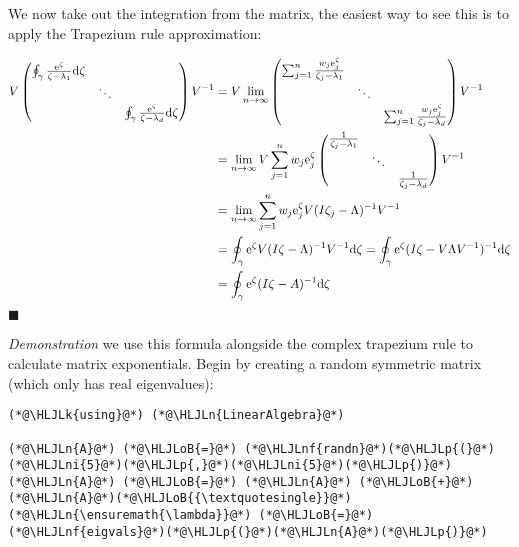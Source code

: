 \documentclass[12pt,a4paper]{article}
\newcommand{\HLJLk}[1]{\textcolor[RGB]{148,91,176}{\textbf{#1}}}
\newcommand{\HLJLn}[1]{#1}
\newcommand{\HLJLnf}[1]{\textcolor[RGB]{66,102,213}{#1}}
\newcommand{\HLJLni}[1]{\textcolor[RGB]{59,151,46}{#1}}
\newcommand{\HLJLoB}[1]{\textcolor[RGB]{102,102,102}{\textbf{#1}}}
\newcommand{\HLJLp}[1]{#1}
\def\D{ {\rm d} }
\def\E{ {\rm e} }
\begin{document}
We now take out the integration from the matrix, the easiest way to see this is to apply the Trapezium rule approximation:


\begin{align*}
V\begin{pmatrix} \oint_\gamma {\E^\zeta \over \zeta - \lambda_1 } \D\zeta \\ & \ddots \\ && \oint_\gamma {\E^\zeta \over \zeta - \lambda_d } \D\zeta\end{pmatrix} V^{-1} &= V\lim_{n \rightarrow \infty} \begin{pmatrix} \sum_{j=1}^n {w_j \E^\zeta_j \over \zeta_j - \lambda_1 }  \\ & \ddots \\ && \sum_{j=1}^n {w_j \E^\zeta_j \over \zeta_j - \lambda_d } \end{pmatrix} V^{-1} \\
&= \lim_{n \rightarrow \infty}  V\sum_{j=1}^n w_j \E^\zeta_j \begin{pmatrix}  {1 \over \zeta_j - \lambda_1 }  \\ & \ddots \\ &&  {1 \over \zeta_j - \lambda_d } \end{pmatrix} V^{-1} \\
&= \lim_{n \rightarrow \infty}  \sum_{j=1}^n w_j \E^\zeta_j V(I \zeta_j - \Lambda)^{-1}V^{-1} \\
&= \oint_\gamma \E^\zeta V(I \zeta - \Lambda)^{-1} V^{-1} \D \zeta 
= \oint_\gamma \E^\zeta (I \zeta - V\Lambda V^{-1})^{-1}  \D \zeta \\
& = \oint_\gamma \E^\zeta (I \zeta - A)^{-1}  \D \zeta \\
\end{align*}
\ensuremath{\blacksquare}

\emph{Demonstration} we use this formula alongside the complex trapezium rule to calculate matrix exponentials.  Begin by creating a random symmetric matrix (which only has real eigenvalues):


\begin{lstlisting}
(*@\HLJLk{using}@*) (*@\HLJLn{LinearAlgebra}@*)

(*@\HLJLn{A}@*) (*@\HLJLoB{=}@*) (*@\HLJLnf{randn}@*)(*@\HLJLp{(}@*)(*@\HLJLni{5}@*)(*@\HLJLp{,}@*)(*@\HLJLni{5}@*)(*@\HLJLp{)}@*)
(*@\HLJLn{A}@*) (*@\HLJLoB{=}@*) (*@\HLJLn{A}@*) (*@\HLJLoB{+}@*) (*@\HLJLn{A}@*)(*@\HLJLoB{{\textquotesingle}}@*)
(*@\HLJLn{\ensuremath{\lambda}}@*) (*@\HLJLoB{=}@*) (*@\HLJLnf{eigvals}@*)(*@\HLJLp{(}@*)(*@\HLJLn{A}@*)(*@\HLJLp{)}@*)
\end{lstlisting}
\end{document}

